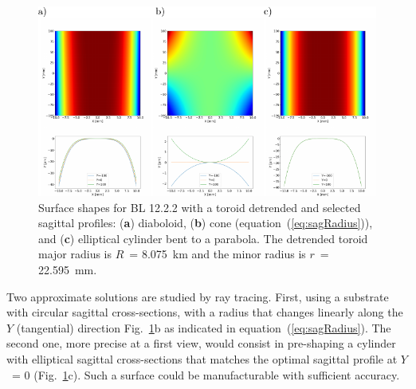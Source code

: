 \documentclass[preprint]{iucr}       %
\begin{document}
\begin{figure}\label{fig:detrendedBeamline}
\includegraphics[width=1.0\textwidth]{figures/fig8.pdf}
% 

\caption{Surface shapes for BL 12.2.2 with a toroid detrended and selected sagittal profiles: (\textbf{a}) diaboloid, (\textbf{b}) cone (equation~(\ref{eq:sagRadius})), and (\textbf{c}) elliptical cylinder bent to a parabola. The detrended toroid major radius is $R$~= \SI{8.075}{\kilo\meter} and the minor radius is $r$~= \SI{22.595}{\milli\meter}.}
\end{figure}

Two approximate solutions are studied by ray tracing. First, using a substrate with circular sagittal cross-sections, with a radius that changes linearly along the $Y$ (tangential) direction Fig.~\ref{fig:detrendedBeamline}b as indicated in equation~(\ref{eq:sagRadius}). The second one, more precise at a first view, would consist in pre-shaping a cylinder with elliptical sagittal cross-sections that matches the optimal sagittal profile at $Y$~= 0 (Fig.~\ref{fig:detrendedBeamline}c). Such a surface could be manufacturable with sufficient accuracy.
\end{document}
